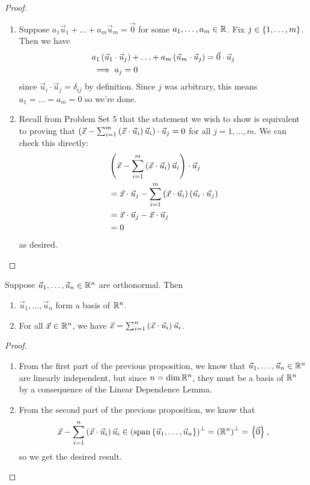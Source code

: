 \documentclass[main.tex]{subfiles}
\begin{document}
\begin{proof}
    \begin{enumerate}
        \item Suppose $a_1\vec{u}_1 + \ldots + a_m\vec{u}_m = \vec{0}$ for some $a_1, \ldots , a_m\in \mathbb R$. Fix $j\in \left\{ 1, \ldots , m \right\}$. Then we have
        \begin{align*}
            &a_1\left( \vec{u}_1\cdot \vec{u}_j \right) + \ldots + a_m\left( \vec{u}_m\cdot \vec{u}_j \right) = \vec{0}\cdot\vec{u}_j \\
            &\implies a_j = 0
        \end{align*}
        since $\vec{u}_i\cdot \vec{u}_j = \delta_{ij}$ by definition. Since $j$ was arbitrary, this means $a_1 = \ldots = a_m = 0$ so we're done.
        \item Recall from Problem Set 5 that the statement we wish to show is equivalent to proving that $\left( \vec{x} - \sum_{i = 1}^m \left( \vec{x}\cdot \vec{u}_i \right)\vec{u}_i \right)\cdot \vec{u}_j = 0$ for all $j = 1, \ldots , m$. We can check this directly:
        \begin{align*}
            &\left( \vec{x} - \sum_{i = 1}^m \left( \vec{x}\cdot \vec{u}_i \right)\vec{u}_i \right)\cdot \vec{u}_j \\
            &= \vec{x} \cdot \vec{u}_j - \sum_{i = 1}^m \left( \vec{x}\cdot \vec{u}_i \right)\left( \vec{u}_i\cdot \vec{u}_j \right) \\
            &= \vec{x} \cdot \vec{u}_j - \vec{x}\cdot \vec{u}_j \\
            &= 0
        \end{align*}
        as desired.
    \end{enumerate}
\end{proof}

\begin{corollary}
    Suppose $\vec{u}_1, \ldots , \vec{u}_n\in \mathbb R^n$ are orthonormal. Then
    \begin{enumerate}
        \item $\vec{u}_1, \ldots , \vec{u}_n$ form a basis of $\mathbb R^n$.
        \item For all $\vec{x}\in \mathbb R^n$, we have $\vec{x} = \sum_{i = 1}^n \left( \vec{x}\cdot\vec{u}_i \right)\vec{u}_i$.
    \end{enumerate}
\end{corollary}

\begin{proof}
    \begin{enumerate}
        \item From the first part of the previous proposition, we know that $\vec{u}_1, \ldots , \vec{u}_n\in \mathbb R^n$ are linearly independent, but since $n = \dim \mathbb R^n$, they must be a basis of $\mathbb R^n$ by a consequence of the Linear Dependence Lemma.
        \item From the second part of the previous proposition, we know that
        \[\vec{x} - \sum_{i = 1}^n \left( \vec{x}\cdot \vec{u}_i \right)\vec{u}_i\in \left( \operatorname{span}\left\{ \vec{u}_1, \ldots , \vec{u}_n \right\} \right)^\perp = \left( \mathbb R^n \right)^\perp = \left\{ \vec{0} \right\},\]
        so we get the desired result.
    \end{enumerate}
\end{proof}
\end{document}
